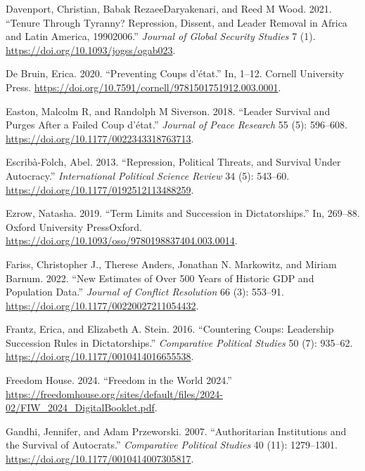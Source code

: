 \documentclass[
  12pt,
]{report}
\newlength{\cslhangindent}
\newenvironment{CSLReferences}[2] %
 {\begin{list}{}{%
  \setlength{\itemindent}{0pt}
  \setlength{\leftmargin}{0pt}
  \setlength{\parsep}{0pt}
  \ifodd #1
   \setlength{\leftmargin}{\cslhangindent}
   \setlength{\itemindent}{-1\cslhangindent}
  \fi
  \setlength{\itemsep}{#2\baselineskip}}}
 {\end{list}}
\begin{document}
\begin{CSLReferences}{1}{0}
Davenport, Christian, Babak RezaeeDaryakenari, and Reed M Wood. 2021.
{``Tenure Through Tyranny? Repression, Dissent, and Leader Removal in
Africa and Latin America, 1990{\textendash}2006.''} \emph{Journal of
Global Security Studies} 7 (1).
\url{https://doi.org/10.1093/jogss/ogab023}.

De Bruin, Erica. 2020. {``Preventing Coups d{'}état.''} In, 1--12.
Cornell University Press.
\url{https://doi.org/10.7591/cornell/9781501751912.003.0001}.

Easton, Malcolm R, and Randolph M Siverson. 2018. {``Leader Survival and
Purges After a Failed Coup d{'}état.''} \emph{Journal of Peace Research}
55 (5): 596--608. \url{https://doi.org/10.1177/0022343318763713}.

Escribà-Folch, Abel. 2013. {``Repression, Political Threats, and
Survival Under Autocracy.''} \emph{International Political Science
Review} 34 (5): 543--60. \url{https://doi.org/10.1177/0192512113488259}.

Ezrow, Natasha. 2019. {``Term Limits and Succession in Dictatorships.''}
In, 269--88. Oxford University PressOxford.
\url{https://doi.org/10.1093/oso/9780198837404.003.0014}.

Fariss, Christopher J., Therese Anders, Jonathan N. Markowitz, and
Miriam Barnum. 2022. {``New Estimates of Over 500 Years of Historic GDP
and Population Data.''} \emph{Journal of Conflict Resolution} 66 (3):
553--91. \url{https://doi.org/10.1177/00220027211054432}.

Frantz, Erica, and Elizabeth A. Stein. 2016. {``Countering Coups:
Leadership Succession Rules in Dictatorships.''} \emph{Comparative
Political Studies} 50 (7): 935--62.
\url{https://doi.org/10.1177/0010414016655538}.

Freedom House. 2024. {``Freedom in the World 2024.''}
\url{https://freedomhouse.org/sites/default/files/2024-02/FIW_2024_DigitalBooklet.pdf}.

Gandhi, Jennifer, and Adam Przeworski. 2007. {``Authoritarian
Institutions and the Survival of Autocrats.''} \emph{Comparative
Political Studies} 40 (11): 1279--1301.
\url{https://doi.org/10.1177/0010414007305817}.


\end{CSLReferences}
\end{document}
